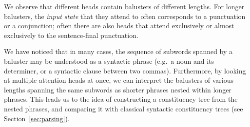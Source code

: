 \documentclass[11pt,a4paper]{article}
\newcommand\eg{e.g.\ }
\newcommand\ie{i.e.\ }
\newcommand{\word}{\emph{input state}\xspace}
\newcommand{\words}{\emph{input states}\xspace}
\newcommand{\states}{\emph{output states}\xspace}
\def\RR#1{{\color{blue}RR: \it #1}}
\def\JL#1{{\color{magenta}JL: \it #1}}
\def\JL#1{}
\def\RR#1{}
\begin{document}
We observe that different heads contain balusters of different lengths. 
For longer balusters, the \word that they attend to often corresponds to a punctuation or a conjunction; often there are also heads that attend exclusively or almost exclusively to the sentence-final punctuation.

We have noticed that in many cases, the sequence of subwords spanned by a baluster may be understood as a syntactic phrase (\eg a noun and its determiner, or a syntactic clause between two commas).
Furthermore, by looking at multiple attention heads at once, we can interpret the balusters of various lengths spanning the same subwords as shorter phrases nested within longer phrases.
This leads us to the idea of constructing a constituency tree from the nested phrases, and comparing it with classical syntactic constituency trees (see Section~\ref{sec:parsing}).



\end{document}

